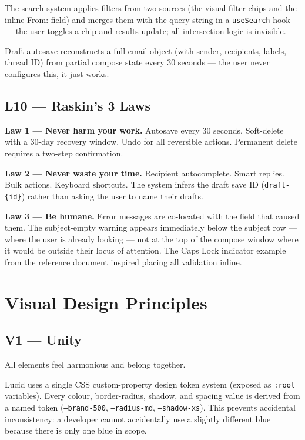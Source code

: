 \documentclass[12pt,a4paper]{report}
\begin{document}
The search system applies filters from two sources (the visual filter chips and the inline
From: field) and merges them with the query string in a \texttt{useSearch} hook — the user
toggles a chip and results update; all intersection logic is invisible.

Draft autosave reconstructs a full email object (with sender, recipients, labels, thread ID)
from partial compose state every 30 seconds — the user never configures this, it just works.

\section{L10 — Raskin's 3 Laws}

\textbf{Law 1 — Never harm your work.} Autosave every 30 seconds. Soft-delete with a
30-day recovery window. Undo for all reversible actions. Permanent delete requires a
two-step confirmation.

\textbf{Law 2 — Never waste your time.} Recipient autocomplete. Smart replies. Bulk
actions. Keyboard shortcuts. The system infers the draft save ID (\texttt{draft-\{id\}})
rather than asking the user to name their drafts.

\textbf{Law 3 — Be humane.} Error messages are co-located with the field that caused them.
The subject-empty warning appears immediately below the subject row — where the user is
already looking — not at the top of the compose window where it would be outside their
locus of attention. The Caps Lock indicator example from the reference document inspired
placing all validation inline.

\chapter{Visual Design Principles}

\section{V1 — Unity}

All elements feel harmonious and belong together.

Lucid uses a single CSS custom-property design token system (exposed as \texttt{:root}
variables). Every colour, border-radius, shadow, and spacing value is derived from a
named token (\texttt{--brand-500}, \texttt{--radius-md}, \texttt{--shadow-xs}). This
prevents accidental inconsistency: a developer cannot accidentally use a slightly different
blue because there is only one blue in scope.
\end{document}
